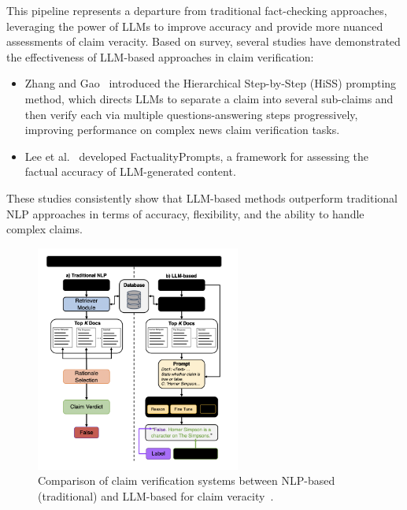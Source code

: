 This pipeline represents a departure from traditional fact-checking approaches, leveraging the power of \ac{LLMs} to improve accuracy and provide more nuanced assessments of claim veracity.
Based on survey, several studies have demonstrated the effectiveness of LLM-based approaches in claim verification:
\begin{itemize}
    \item Zhang and Gao~\cite{zhang2023llmbasedfactverificationnews} introduced the Hierarchical Step-by-Step (HiSS) prompting method, which directs LLMs to separate a claim into several sub-claims and then verify each via multiple questions-answering steps progressively, improving performance on complex news claim verification tasks.
    \item Lee et al.~\cite{lee2023factualityenhancedlanguagemodels} developed FactualityPrompts, a framework for assessing the factual accuracy of LLM-generated content.
\end{itemize}

These studies consistently show that LLM-based methods outperform traditional NLP approaches in terms of accuracy, flexibility, and the ability to handle complex claims.
\begin{figure}[ht!]
    \centering
    \begin{minipage}[b]{\textwidth}
        \centering
        \includegraphics[width=0.6\textwidth]{res/rel-claim-verification}
    \end{minipage}
    \caption{Comparison of claim verification systems between NLP-based (traditional) and LLM-based for claim veracity~\cite{dmonte2024claimverificationagelarge}.}
    \label{fig:claim-verification-llm}
\end{figure}

